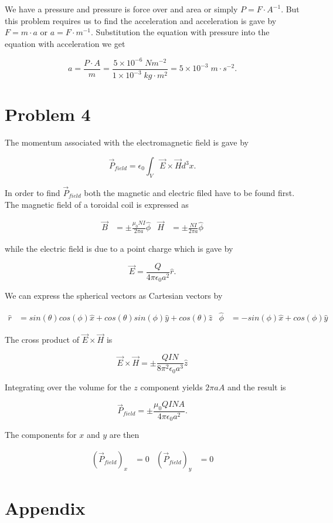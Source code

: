 \documentclass[11pt]{article}
\begin{document}
We have a pressure and pressure is force over and area or simply $P = F \cdot A^{-1}$. But this problem requires us to find the acceleration and acceleration is gave by $F = m \cdot a$ or $a = F \cdot m^{-1}$. Substitution the equation with pressure into the equation with acceleration we get

$$
a = \frac{P \cdot A}{m} = \frac{5\times10^{-6} \; Nm^{-2}}{1\times10^{-3} \; kg \cdot m^{2}} = 5\times 10^{-3} \; m \cdot s^{-2}.
$$

\clearpage

\section*{Problem 4}

The momentum associated with the electromagnetic field is gave by

$$
\vec{P}_{field} = \epsilon_{0} \int_{V} \vec{E} \times \vec{H} d^{3}x.
$$

In order to find $\vec{P}_{field}$ both the magnetic and electric filed have to be found first. The magnetic field of a toroidal coil is expressed as

\begin{align*}
\vec{B} &= \pm \frac{\mu_{0} N I}{2\pi a} \hat{\phi} &
\vec{H} &= \pm \frac{N I}{2\pi a} \hat{\phi}
\end{align*}

while the electric field is due to a point charge which is gave by 

$$
\vec{E} = \frac{Q}{4\pi \epsilon_{0} a^{2}} \hat{r}.
$$

We can express the spherical vectors as Cartesian vectors by

\begin{align*}
\hat{r} &= sin(\theta) cos(\phi) \hat{x} + cos(\theta) sin(\phi) \hat{y} + cos(\theta) \hat{z}&
\hat{\phi} & = -sin(\phi) \hat{x} + cos(\phi) \hat{y}
\end{align*}

The cross product of $\vec{E} \times \vec{H}$ is

$$
\vec{E} \times \vec{H} = \pm \frac{ Q I N}{8 \pi^{2} \epsilon_{0} a^{3}} \hat{z}
$$

Integrating over the volume for the $z$ component yields $2\pi a A$ and the result is

$$
\vec{P}_{field} = \pm \frac{ \mu_{0} Q I N A}{4 \pi \epsilon_{0} a^{2}}. 
$$

The components for $x$ and $y$ are then 

\begin{align*}
(\vec{P}_{field})_{x} &= 0 &
(\vec{P}_{field})_{y} &= 0 
\end{align*}

\clearpage

\section*{Appendix}

\subsection*{}
%

\clearpage


\end{document}

